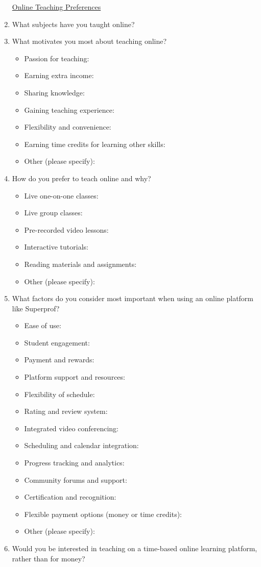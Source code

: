 \begin{enumerate}
\underline{Online Teaching Preferences}
\item What subjects have you taught online?

\item What motivates you most about teaching online?
\begin{itemize}
\item Passion for teaching:
\item Earning extra income:
\item Sharing knowledge:
\item Gaining teaching experience:
\item Flexibility and convenience:
\item Earning time credits for learning other skills:
\item Other (please specify):
\end{itemize}

\item How do you prefer to teach online and why?
\begin{itemize}
\item Live one-on-one classes:
\item Live group classes:
\item Pre-recorded video lessons:
\item Interactive tutorials:
\item Reading materials and assignments:
\item Other (please specify):
\end{itemize}

\item What factors do you consider most important when using an online platform like Superprof?
\begin{itemize}
\item Ease of use:
\item Student engagement:
\item Payment and rewards:
\item Platform support and resources:
\item Flexibility of schedule:
\item Rating and review system:
\item Integrated video conferencing:
\item Scheduling and calendar integration:
\item Progress tracking and analytics:
\item Community forums and support:
\item Certification and recognition:
\item Flexible payment options (money or time credits):
\item Other (please specify):
\end{itemize}
\item Would you be interested in teaching on a time-based online learning platform, rather than for money?


\end{enumerate}
